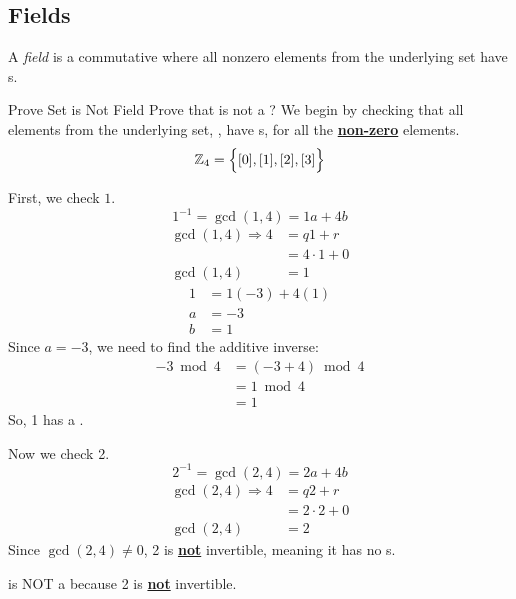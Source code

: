 \subsection{Fields}\label{subsec:Fields}
\begin{definition}[Field]\label{def:Field}
  A \emph{field} is a commutative  where all nonzero elements from the underlying set have s.
\end{definition}

\begin{example}{Prove Set is Not Field}
  Prove that  is not a ?
  \tcblower{}
  We begin by checking that all elements from the underlying set, , have s, for all the \textbf{\underline{non-zero}} elements.
  \begin{equation*}
    \operatorname{\mathbb{Z}}_{4} = \Bigl \lbrace [0], [1], [2], [3] \Bigr \rbrace
  \end{equation*}

  First, we check $1$.
  \begin{equation*}
    1^{-1} = \gcd(1, 4) = 1a + 4b
  \end{equation*}
  \begin{align*}
    \gcd(1, 4) \Rightarrow 4 &= q1 + r \\
                             &= 4 \cdot 1 + 0 \\
    \gcd(1, 4) &= 1
  \end{align*}
  \begin{align*}
    1 &= 1 (-3) + 4 (1) \\
    a &= -3 \\
    b &= 1
  \end{align*}
  Since $a = -3$, we need to find the additive inverse:
  \begin{align*}
    -3 \bmod 4 &= (-3 + 4) \bmod 4 \\
               &= 1 \bmod 4 \\
               &= 1
  \end{align*}
  So, 1 has a .

  Now we check 2.
  \begin{equation*}
    2^{-1} = \gcd(2, 4) = 2a + 4b
  \end{equation*}
  \begin{align*}
    \gcd(2, 4) \Rightarrow 4 &= q2 + r \\
                             &= 2 \cdot 2 + 0 \\
    \gcd(2, 4) &= 2
  \end{align*}
  Since $\gcd(2, 4) \neq 0$, 2 is \textbf{\underline{not}} invertible, meaning it has no s.

   is NOT a  because 2 is \textbf{\underline{not}} invertible.
\end{example}

